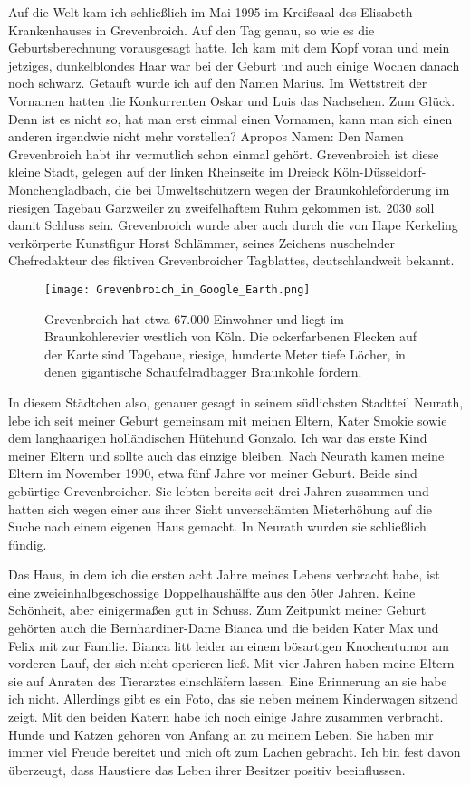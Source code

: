 \documentclass[fontsize=12pt,a4paper,headinclude,DIV=calc,automark]{scrbook}
\begin{document}
Auf die Welt kam ich schließlich im Mai 1995 im Kreißsaal des Elisabeth-Kran\-ken\-hau\-ses in Grevenbroich. Auf den Tag genau, so wie es die Geburtsberechnung vorausgesagt hatte. Ich kam mit dem Kopf voran und mein jetziges, dunkelblondes Haar war bei der Geburt und auch einige Wochen danach noch schwarz. Getauft wurde ich auf den Namen Marius. Im Wettstreit der Vornamen hatten die Konkurrenten Oskar und Luis das Nachsehen. Zum Glück. Denn ist es nicht so, hat man erst einmal einen Vornamen, kann man sich einen anderen irgendwie nicht mehr vorstellen?
Apropos Namen: Den Namen Grevenbroich habt ihr vermutlich schon einmal gehört. Grevenbroich ist diese kleine Stadt, gelegen auf der linken Rheinseite im Dreieck Köln-Düsseldorf-Mönchengladbach, die bei Umweltschützern wegen der Braunkohleförderung im riesigen Tagebau Garzweiler zu zweifelhaftem Ruhm gekommen ist. 2030 soll damit Schluss sein. Grevenbroich wurde aber auch durch die von Hape Kerkeling verkörperte Kunstfigur Horst Schlämmer, seines Zeichens nuschelnder Chefredakteur des fiktiven Grevenbroicher Tagblattes, deutschlandweit bekannt.

\begin{figure}[ht]
    \centering
    \texttt{[image: Grevenbroich\_in\_Google\_Earth.png]}
    \caption{Grevenbroich hat etwa 67.000 Einwohner und liegt im Braunkohlerevier westlich von Köln. Die ockerfarbenen Flecken auf der Karte sind Tagebaue, riesige, hunderte Meter tiefe Löcher, in denen gigantische Schaufelradbagger Braunkohle fördern.}
    \label{fig:grevenbroich}
\end{figure}

In diesem Städtchen also, genauer gesagt in seinem südlichsten Stadtteil Neurath, lebe ich seit meiner Geburt gemeinsam mit meinen Eltern, Kater Smokie sowie dem langhaarigen holländischen Hütehund Gonzalo. Ich war das erste Kind meiner Eltern und sollte auch das einzige bleiben. Nach Neurath kamen meine Eltern im November 1990, etwa fünf Jahre vor meiner Geburt. Beide sind gebürtige Grevenbroicher. Sie lebten bereits seit drei Jahren zusammen und hatten sich wegen einer aus ihrer Sicht unverschämten Mieterhöhung auf die Suche nach einem eigenen Haus gemacht. In Neurath wurden sie schließlich fündig.

Das Haus, in dem ich die ersten acht Jahre meines Lebens verbracht habe, ist eine zweieinhalbgeschossige Doppelhaushälfte aus den 50er Jahren. Keine Schönheit, aber einigermaßen gut in Schuss. Zum Zeitpunkt meiner Geburt gehörten auch die Bernhardiner-Dame Bianca und die beiden Kater Max und Felix mit zur Familie. Bianca litt leider an einem bösartigen Knochentumor am vorderen Lauf, der sich nicht operieren ließ. Mit vier Jahren haben meine Eltern sie auf Anraten des Tierarztes einschläfern lassen. Eine Erinnerung an sie habe ich nicht. Allerdings gibt es ein Foto, das sie neben meinem Kinderwagen sitzend zeigt. Mit den beiden Katern habe ich noch einige Jahre zusammen verbracht. Hunde und Katzen gehören von Anfang an zu meinem Leben. Sie haben mir immer viel Freude bereitet und mich oft zum Lachen gebracht. Ich bin fest davon überzeugt, dass Haustiere das Leben ihrer Besitzer positiv beeinflussen.
\end{document}
